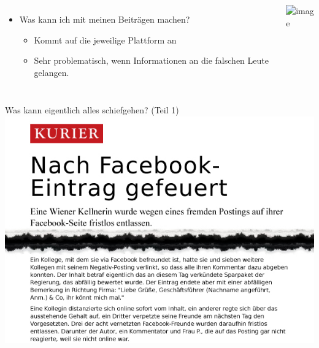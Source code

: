 \begin{frame}
	\begin{columns}
	
	\column{150pt}	
	\begin{itemize}
		\item <1-> Was kann ich mit meinen Beiträgen machen?
		\begin{itemize}
			\item <2-> Kommt auf die jeweilige Plattform an
			\item <3-> Sehr problematisch, wenn Informationen an die falschen Leute gelangen.
		\end{itemize}
	\end{itemize}	
	\column{129pt}
	\includegraphics<4->[scale=0.5]{socialmedia-memes/scumbag_steve.jpg}
	\end{columns}
\end{frame}

\begin{frame}
	Was kann eigentlich alles schiefgehen? (Teil 1)\\
		\includegraphics[scale=0.5]{facebook-news/facebook-gefeuert.jpg}
\end{frame}

